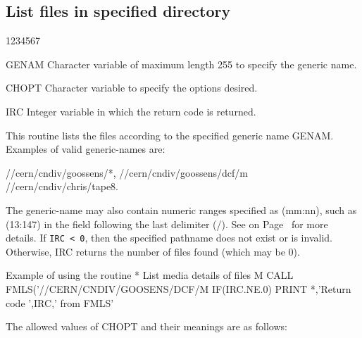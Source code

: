 \subsection{List files in specified directory}
\begin{DLtt}{1234567}
\item[GENAM]
Character variable of maximum length 255 to specify the generic name.
\item[CHOPT]
Character variable to specify the options desired.
\item[IRC]
Integer variable in which the return code is returned.
\end{DLtt}
\par
This routine lists the files according to the specified generic name GENAM.
Examples of valid generic-names are:
\begin{XMP}
//cern/cndiv/goossens/*,
//cern/cndiv/goossens/dcf/m%
//cern/cndiv/chris/tape8.
\end{XMP}
The generic-name may also contain
numeric ranges specified as (mm:nn), such as (13:147) in the field
following the last delimiter (/).
See on Page~\pageref{FMATCH} for more details.
If {\tt IRC < 0}, then the specified pathname does not
exist or is invalid. Otherwise, IRC returns the number of files found
(which may be 0).
\begin{XMPt}{Example of using the \protect{} routine}
*     List media details of files M%
      CALL FMLS('//CERN/CNDIV/GOOSENS/DCF/M%
      IF(IRC.NE.0) PRINT *,'Return code ',IRC,' from FMLS'
\end{XMPt}
\par
The allowed values of CHOPT and their meanings are as follows:
